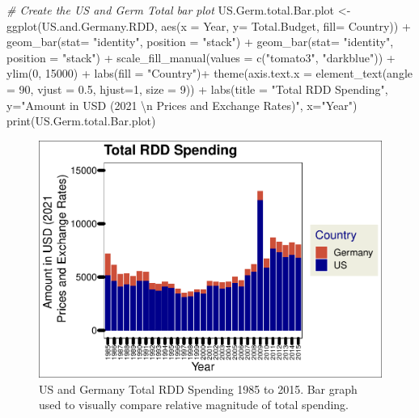 \documentclass[
  12pt,
]{article}
\newenvironment{Shaded}{\begin{snugshade}}{\end{snugshade}}
\newcommand{\AttributeTok}[1]{\textcolor[rgb]{0.77,0.63,0.00}{#1}}
\newcommand{\CommentTok}[1]{\textcolor[rgb]{0.56,0.35,0.01}{\textit{#1}}}
\newcommand{\DecValTok}[1]{\textcolor[rgb]{0.00,0.00,0.81}{#1}}
\newcommand{\FloatTok}[1]{\textcolor[rgb]{0.00,0.00,0.81}{#1}}
\newcommand{\FunctionTok}[1]{\textcolor[rgb]{0.00,0.00,0.00}{#1}}
\newcommand{\NormalTok}[1]{#1}
\newcommand{\OtherTok}[1]{\textcolor[rgb]{0.56,0.35,0.01}{#1}}
\newcommand{\SpecialCharTok}[1]{\textcolor[rgb]{0.00,0.00,0.00}{#1}}
\newcommand{\StringTok}[1]{\textcolor[rgb]{0.31,0.60,0.02}{#1}}
\begin{document}
\begin{Shaded}
\begin{Highlighting}[]
\CommentTok{\# Create the US and Germ Total bar plot}
\NormalTok{US.Germ.total.Bar.plot }\OtherTok{\textless{}{-}} \FunctionTok{ggplot}\NormalTok{(US.and.Germany.RDD, }\FunctionTok{aes}\NormalTok{(}\AttributeTok{x =}\NormalTok{ Year, }\AttributeTok{y=}\NormalTok{ Total.Budget, }\AttributeTok{fill=}\NormalTok{ Country)) }\SpecialCharTok{+}
  \FunctionTok{geom\_bar}\NormalTok{(}\AttributeTok{stat=} \StringTok{"identity"}\NormalTok{, }\AttributeTok{position =} \StringTok{"stack"}\NormalTok{) }\SpecialCharTok{+}
  \FunctionTok{geom\_bar}\NormalTok{(}\AttributeTok{stat=} \StringTok{"identity"}\NormalTok{, }\AttributeTok{position =} \StringTok{"stack"}\NormalTok{) }\SpecialCharTok{+}
  \FunctionTok{scale\_fill\_manual}\NormalTok{(}\AttributeTok{values =} \FunctionTok{c}\NormalTok{(}\StringTok{"tomato3"}\NormalTok{, }\StringTok{"darkblue"}\NormalTok{)) }\SpecialCharTok{+}
  \FunctionTok{ylim}\NormalTok{(}\DecValTok{0}\NormalTok{, }\DecValTok{15000}\NormalTok{) }\SpecialCharTok{+}
  \FunctionTok{labs}\NormalTok{(}\AttributeTok{fill =} \StringTok{"Country"}\NormalTok{)}\SpecialCharTok{+}
  \FunctionTok{theme}\NormalTok{(}\AttributeTok{axis.text.x =} \FunctionTok{element\_text}\NormalTok{(}\AttributeTok{angle =} \DecValTok{90}\NormalTok{, }\AttributeTok{vjust =} \FloatTok{0.5}\NormalTok{, }\AttributeTok{hjust=}\DecValTok{1}\NormalTok{, }\AttributeTok{size =} \DecValTok{9}\NormalTok{)) }\SpecialCharTok{+}
  \FunctionTok{labs}\NormalTok{(}\AttributeTok{title =} \StringTok{"Total RDD Spending"}\NormalTok{,}
       \AttributeTok{y=}\StringTok{"Amount in USD (2021 }\SpecialCharTok{\textbackslash{}n}\StringTok{ Prices and Exchange Rates)"}\NormalTok{,}
       \AttributeTok{x=}\StringTok{"Year"}\NormalTok{)}
\FunctionTok{print}\NormalTok{(US.Germ.total.Bar.plot)}
\end{Highlighting}
\end{Shaded}

\begin{figure}
\centering
\includegraphics{Chang_Jenkins_Mullens_ENV872_Final_files/figure-latex/Germany and US Bar Plot for total budget-1.pdf}
\caption{US and Germany Total RDD Spending 1985 to 2015. Bar graph used
to visually compare relative magnitude of total spending.}
\end{figure}
\end{document}
